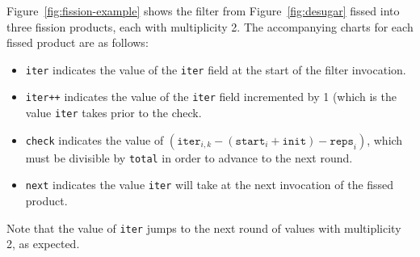 Figure~\ref{fig:fission-example} shows the filter from Figure~\ref{fig:desugar} fissed into three fission products, each with multiplicity 2.  The accompanying charts for each fissed product are as follows:
\begin{itemize}
\item{\tt iter} indicates the value of the {\tt iter} field at the start of the filter invocation.  
\item{\tt iter++} indicates the value of the {\tt iter} field incremented by 1 (which is the value {\tt iter} takes prior to the check.  
\item{\tt check} indicates the value of $(\texttt{iter}_{i,k} - (\texttt{start}_i + \texttt{init}) - \texttt{reps}_i)$, which must be divisible by {\tt total} in order to advance to the next round.  
\item{\tt next} indicates the value {\tt iter} will take at the next invocation of the fissed product.
\end{itemize}
Note that the value of \texttt{iter} jumps to the next round of values with multiplicity 2, as expected.